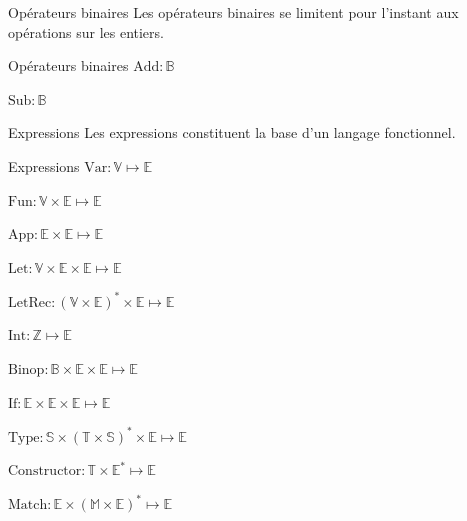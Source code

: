 \documentclass{beamer}
\begin{document}
\begin{frame}{Opérateurs binaires}
    Les opérateurs binaires se limitent pour l'instant aux opérations sur les entiers.

    \begin{block}{Opérateurs binaires}
        $\text{Add} : \mathbb{B}$%

        $\text{Sub} : \mathbb{B}$%
    \end{block}
\end{frame}

\begin{frame}{Expressions}
    Les expressions constituent la base d'un langage fonctionnel.%

    \begin{block}{Expressions}
        $\text{Var} : \mathbb{V} \mapsto \mathbb{E}$%

        $\text{Fun} : \mathbb{V} \times \mathbb{E} \mapsto \mathbb{E}$%

        $\text{App} : \mathbb{E} \times \mathbb{E} \mapsto \mathbb{E}$%

        $\text{Let} : \mathbb{V} \times \mathbb{E} \times \mathbb{E} \mapsto \mathbb{E}$%

        $\text{LetRec} : (\mathbb{V} \times \mathbb{E})^{*} \times \mathbb{E} \mapsto \mathbb{E}$%

        $\text{Int} : \mathbb{Z} \mapsto \mathbb{E}$%

        $\text{Binop} : \mathbb{B} \times \mathbb{E} \times \mathbb{E} \mapsto \mathbb{E}$%

        $\text{If} : \mathbb{E} \times \mathbb{E} \times \mathbb{E} \mapsto \mathbb{E}$%

        $\text{Type} : \mathbb{S} \times (\mathbb{T} \times \mathbb{S})^{*} \times \mathbb{E} \mapsto \mathbb{E}$%

        $\text{Constructor} : \mathbb{T} \times \mathbb{E}^{*} \mapsto \mathbb{E}$%

        $\text{Match} : \mathbb{E} \times (\mathbb{M} \times \mathbb{E})^{*} \mapsto \mathbb{E}$%
    \end{block}
\end{frame}
\end{document}
